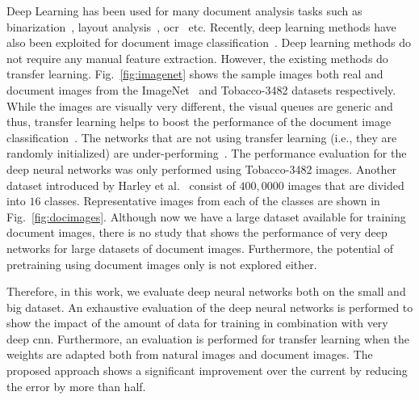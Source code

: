 Deep Learning has been used for many document analysis tasks such as binarization~\cite{afzal2015documentbin, pastor2015insights}, layout analysis~\cite{pastor2016complete, seuret2017pca}, \ac{ocr}~\cite{liwicki2007novel, breuel2013high, ahmad2015scale, ahmed2016evaluation, ahmed2016generic, ul2015sequence} etc.
Recently, deep learning methods have also been exploited for document image classification~\cite{afzal2015deepdocclassifier, lekang_14_a, harley2015evaluation}.
Deep learning methods do not require any manual feature extraction.
However, the existing \sota methods do transfer learning. 
Fig.~\ref{fig:imagenet} shows the sample images both real and document images from the ImageNet~\cite{russakovsky2015imagenet} and Tobacco-3482 datasets respectively. 
While the images are visually very different, the visual queues are generic and thus, transfer learning helps to boost the performance of the document image classification~\cite{afzal2015deepdocclassifier, harley2015evaluation}.
The networks that are not using transfer learning (i.e., they are randomly initialized) are under-performing~\cite{lekang_14_a}.
The performance evaluation for the deep neural networks was only performed using Tobacco-3482 images. 
Another dataset introduced by Harley et al.~\cite{harley2015evaluation} consist of $400,0000$ images that are divided into $16$ classes. Representative images from each of the classes are shown in Fig.~\ref{fig:docimages}.
Although now we have a large dataset available for training document images, there is no study that shows the performance of very deep networks for large datasets of document images. Furthermore, the potential of pretraining using document images only is not explored either.

Therefore, in this work, we evaluate deep neural networks both on the small and big dataset.
An exhaustive evaluation of the deep neural networks is performed to show the impact of the amount of data for training in combination with very deep \ac{cnn}. Furthermore, an evaluation is performed for transfer learning when the weights are adapted both from natural images and document images. The proposed approach shows a significant improvement over the current \sota by reducing the error by more than half.

